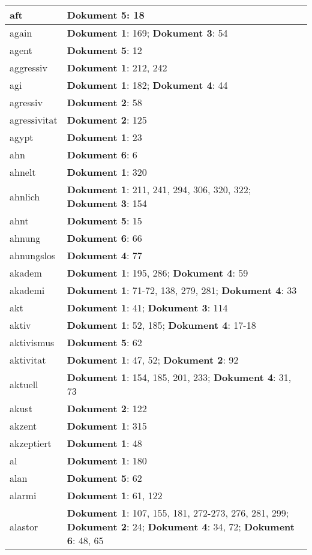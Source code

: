 \documentclass[a5paper]{article}
\begin{document}
\begin{longtable}[l]{|l|p{3in}|}
\hline
aft & \textbf{Dokument 5}: 18 \\
\hline
again & \textbf{Dokument 1}: 169; \textbf{Dokument 3}: 54 \\
\hline
agent & \textbf{Dokument 5}: 12 \\
\hline
aggressiv & \textbf{Dokument 1}: 212, 242 \\
\hline
agi & \textbf{Dokument 1}: 182; \textbf{Dokument 4}: 44 \\
\hline
agressiv & \textbf{Dokument 2}: 58 \\
\hline
agressivitat & \textbf{Dokument 2}: 125 \\
\hline
agypt & \textbf{Dokument 1}: 23 \\
\hline
ahn & \textbf{Dokument 6}: 6 \\
\hline
ahnelt & \textbf{Dokument 1}: 320 \\
\hline
ahnlich & \textbf{Dokument 1}: 211, 241, 294, 306, 320, 322; \textbf{Dokument 3}: 154 \\
\hline
ahnt & \textbf{Dokument 5}: 15 \\
\hline
ahnung & \textbf{Dokument 6}: 66 \\
\hline
ahnungslos & \textbf{Dokument 4}: 77 \\
\hline
akadem & \textbf{Dokument 1}: 195, 286; \textbf{Dokument 4}: 59 \\
\hline
akademi & \textbf{Dokument 1}: 71-72, 138, 279, 281; \textbf{Dokument 4}: 33 \\
\hline
akt & \textbf{Dokument 1}: 41; \textbf{Dokument 3}: 114 \\
\hline
aktiv & \textbf{Dokument 1}: 52, 185; \textbf{Dokument 4}: 17-18 \\
\hline
aktivismus & \textbf{Dokument 5}: 62 \\
\hline
aktivitat & \textbf{Dokument 1}: 47, 52; \textbf{Dokument 2}: 92 \\
\hline
aktuell & \textbf{Dokument 1}: 154, 185, 201, 233; \textbf{Dokument 4}: 31, 73 \\
\hline
akust & \textbf{Dokument 2}: 122 \\
\hline
akzent & \textbf{Dokument 1}: 315 \\
\hline
akzeptiert & \textbf{Dokument 1}: 48 \\
\hline
al & \textbf{Dokument 1}: 180 \\
\hline
alan & \textbf{Dokument 5}: 62 \\
\hline
alarmi & \textbf{Dokument 1}: 61, 122 \\
\hline
alastor & \textbf{Dokument 1}: 107, 155, 181, 272-273, 276, 281, 299; \textbf{Dokument 2}: 24; \textbf{Dokument 4}: 34, 72; \textbf{Dokument 6}: 48, 65 \\

\end{longtable}
\end{document}
